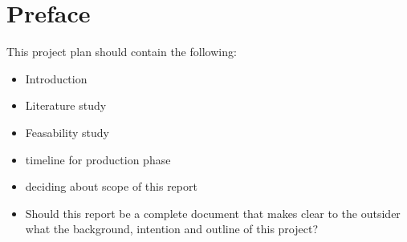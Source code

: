 \chapter*{Preface}

This project plan should contain the following: 

\begin{itemize}
	\item Introduction
	\item Literature study
	\item Feasability study
	\item timeline for production phase
	\item deciding about scope of this report
	\item Should this report be a complete document that makes clear to the outsider 
		what the background, intention and outline of this project?
\end{itemize}